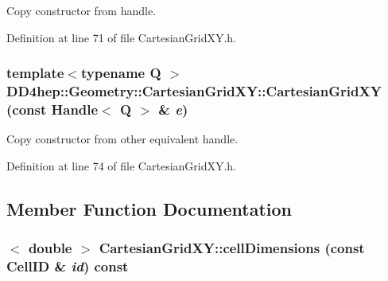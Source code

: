 Copy constructor from handle. 

Definition at line 71 of file CartesianGridXY.h.\hypertarget{class_d_d4hep_1_1_geometry_1_1_cartesian_grid_x_y_a3308769eb474b27e025bc6ac41386dd7}{
\subsubsection[{CartesianGridXY}]{\setlength{\rightskip}{0pt plus 5cm}template$<$typename Q $>$ DD4hep::Geometry::CartesianGridXY::CartesianGridXY (const {\bf Handle}$<$ Q $>$ \& {\em e})}}
\label{class_d_d4hep_1_1_geometry_1_1_cartesian_grid_x_y_a3308769eb474b27e025bc6ac41386dd7}


Copy constructor from other equivalent handle. 

Definition at line 74 of file CartesianGridXY.h.

\subsection{Member Function Documentation}
\hypertarget{class_d_d4hep_1_1_geometry_1_1_cartesian_grid_x_y_a2f04ec459749d9b0498fbf4601d19a20}{
\subsubsection[{cellDimensions}]{$<$ double $>$ CartesianGridXY::cellDimensions (const CellID \& {\em id}) const}}
\label{class_d_d4hep_1_1_geometry_1_1_cartesian_grid_x_y_a2f04ec459749d9b0498fbf4601d19a20}


